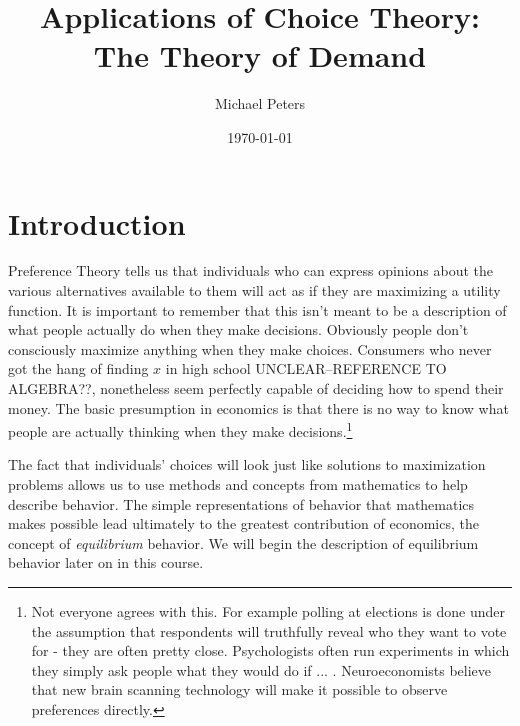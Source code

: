 \documentclass[12pt]{article}
\newcommand{\tmem}[1]{\textit{#1}}
\begin{document}
\title{Applications of Choice Theory: The Theory of
Demand}
\author{Michael Peters}
\date{\today}
\maketitle

\section{Introduction}

Preference Theory tells us that individuals who can express opinions about the
various alternatives available to them will act as if they are maximizing a
utility function. It is important to remember that this isn't meant to be a
description of what people actually do when they make decisions. Obviously
people don't consciously maximize anything when they make choices. Consumers
who never got the hang of finding $x$ in high school UNCLEAR--REFERENCE TO ALGEBRA??, nonetheless seem
perfectly capable of deciding how to spend their money. The basic presumption
in economics is that there is no way to know what people are actually thinking
when they make decisions.{\footnote{Not everyone agrees with this. For example
polling at elections is done under the assumption that respondents will
truthfully reveal who they want to vote for - they are often pretty close.
Psychologists often run experiments in which they simply ask people what they
would do if ... . Neuroeconomists believe that new brain scanning technology
will make it possible to observe preferences directly.}}

The fact that individuals' choices will look just like solutions to
maximization problems allows us to use methods and concepts from mathematics
to help describe behavior. The simple representations of behavior that
mathematics makes possible lead ultimately to the greatest contribution of
economics, the concept of {\tmem{equilibrium}} behavior. We will begin the
description of equilibrium behavior later on in this course.
\end{document}
